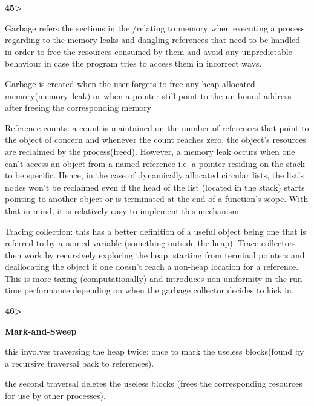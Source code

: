 \documentclass[12pt]{article}
\renewcommand{\_}{\kern-1.5pt\textunderscore\kern-1.5pt}
\begin{document}
\vspace{\baselineskip}
\textbf{45>}\par

Garbage refers the sections in the /relating to memory when executing a process regarding to the memory leaks and dangling references that need to be handled in order to free the resources consumed by them and avoid any unpredictable behaviour in case the program tries to access them in incorrect ways.\par

Garbage is created when the user forgets to free any heap-allocated memory(memory\ leak) or when a  pointer still point to the un-bound address after freeing the corresponding memory\par

Reference counts: a count is maintained on the number of references that point to the object of concern and whenever the count reaches zero, the object's resources are reclaimed by the process(freed). However, a memory leak occurs when one can't access an object from a named reference i.e. a pointer residing on the stack to be specific. Hence, in the case of dynamically allocated circular lists, the list's nodes won't be reclaimed even if the head of the list (located in the stack) starts pointing to another object or is terminated at the end of a function's scope. With that in mind, it is relatively easy to implement this mechanism.\par

Tracing collection: this has a better definition of a useful object being one that is referred to by a named variable (something outside the heap). Trace collectors then work by recursively exploring the heap, starting from terminal pointers and deallocating the object if one doesn't reach a non-heap location for a reference. This is more taxing (computationally) and introduces non-uniformity in the run-time performance depending on when the garbage collector decides to kick in.\par


\vspace{\baselineskip}
\textbf{46>}\par

\textbf{Mark-and-Sweep}\par

this involves traversing the heap twice: once to mark the useless blocks(found by a recursive traversal back to references).\par

the second traversal deletes the useless blocks (frees the corresponding resources for use by other processes).\par
\end{document}
